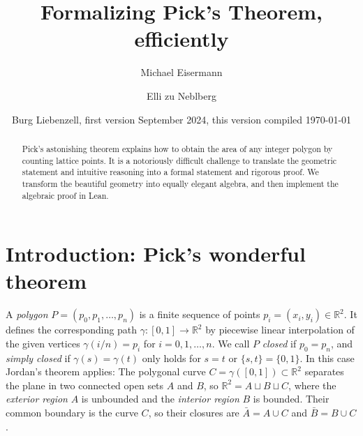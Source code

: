 \documentclass[a4paper]{amsart}
\title{Formalizing Pick's Theorem, efficiently} %
\author{Michael Eisermann}
\author{Elli zu Neblberg}
\date{Burg Liebenzell, first version September 2024, this version compiled \today}
\numberwithin{equation}{section}
\theoremstyle{plain}
\theoremstyle{definition}
\newcommand{\R}{\mathbb{R}}
\begin{document}

\begin{abstract}
  Pick's astonishing theorem explains how to obtain %
  the area of any integer polygon by counting lattice points. %
  It is a notoriously difficult challenge %
  to translate the geometric statement and intuitive reasoning
  into a formal statement and rigorous proof. %
  We transform the beautiful geometry into equally elegant algebra,
  and then implement the algebraic proof in Lean.  
\end{abstract}

\maketitle


\section{Introduction: Pick's wonderful theorem} \label{sec:Introduction}




A \emph{polygon} $P = (p_0,p_1,\ldots,p_n)$ is %
a finite sequence of points $p_i = (x_i,y_i) \in \R^2$.
It defines the corresponding path $\gamma \colon [0,1] \to \R^2$
by piecewise linear interpolation of the given vertices
$\gamma(i/n) = p_i$ for $i=0,1,\dots,n$.
We call $P$ \emph{closed} if $p_0 = p_n$, and
\emph{simply closed} if $\gamma(s) = \gamma(t)$
only holds for $s = t$ or $\{s,t\} = \{0,1\}$.
In this case Jordan's theorem applies:
The polygonal curve $C = \gamma([0,1]) \subset \R^2$
separates the plane in two connected open sets $A$ and $B$,
so $\R^2 = A \sqcup B \sqcup C$, where the \emph{exterior region} $A$
is unbounded and the \emph{interior region} $B$ is bounded.
Their common boundary is the curve $C$, so their closures
are $\bar{A} = A \cup C$ and $\bar{B} = B \cup C$.
\end{document}
